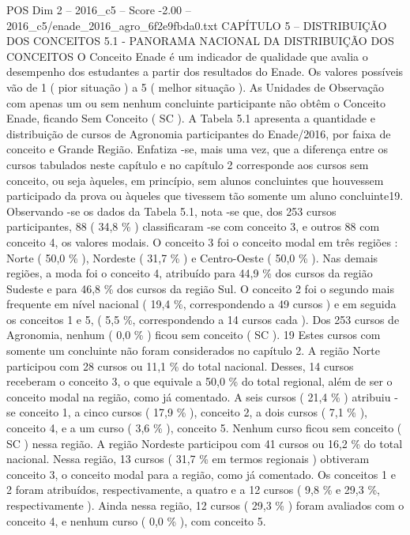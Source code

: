 \begin{textsample}{POS Dim 2 – 2016\_c5 – Score -2.00 – 2016\_c5/enade\_2016\_agro\_6f2e9fbda0.txt}  \label{ex:f2_pos_403}
CAPÍTULO 5 – DISTRIBUIÇÃO DOS CONCEITOS 5.1 - PANORAMA NACIONAL DA DISTRIBUIÇÃO DOS CONCEITOS O Conceito Enade é um indicador de qualidade que avalia o desempenho dos estudantes a partir dos resultados do Enade.
Os valores possíveis vão de 1 ( pior situação ) a 5 ( melhor situação ).
As Unidades de Observação com apenas um ou sem nenhum concluinte participante não obtêm o Conceito Enade, ficando Sem Conceito ( SC ).
A Tabela 5.1 apresenta a quantidade e distribuição de cursos de Agronomia participantes do Enade/2016, por faixa de conceito e Grande Região.
Enfatiza -se, mais uma vez, que a diferença entre os cursos tabulados neste capítulo e no capítulo 2 corresponde aos cursos sem conceito, ou seja àqueles, em princípio, sem alunos concluintes que houvessem participado da prova ou àqueles que tivessem tão somente um aluno concluinte19.
Observando -se os dados da Tabela 5.1, nota -se que, dos 253 cursos participantes, 88 ( 34,8 \% ) classificaram -se com conceito 3, e outros 88 com conceito 4, os valores modais.
O conceito 3 foi o conceito modal em três regiões : Norte ( 50,0 \% ), Nordeste ( 31,7 \% ) e Centro-Oeste ( 50,0 \% ).
Nas demais regiões, a moda foi o conceito 4, atribuído para 44,9 \% dos cursos da região Sudeste e para 46,8 \% dos cursos da região Sul.
O conceito 2 foi o segundo mais frequente em nível nacional ( 19,4 \%, correspondendo a 49 cursos ) e em seguida os conceitos 1 e 5, ( 5,5 \%, correspondendo a 14 cursos cada ).
Dos 253 cursos de Agronomia, nenhum ( 0,0 \% ) ficou sem conceito ( SC ). 19 Estes cursos com somente um concluinte não foram considerados no capítulo 2.
A região Norte participou com 28 cursos ou 11,1 \% do total nacional.
Desses, 14 cursos receberam o conceito 3, o que equivale a 50,0 \% do total regional, além de ser o conceito modal na região, como já comentado.
A seis cursos ( 21,4 \% ) atribuiu -se conceito 1, a cinco cursos ( 17,9 \% ), conceito 2, a dois cursos ( 7,1 \% ), conceito 4, e a um curso ( 3,6 \% ), conceito 5.
Nenhum curso ficou sem conceito ( SC ) nessa região.
A região Nordeste participou com 41 cursos ou 16,2 \% do total nacional.
Nessa região, 13 cursos ( 31,7 \% em termos regionais ) obtiveram conceito 3, o conceito modal para a região, como já comentado.
Os conceitos 1 e 2 foram atribuídos, respectivamente, a quatro e a 12 cursos ( 9,8 \% e 29,3 \%, respectivamente ).
Ainda nessa região, 12 cursos ( 29,3 \% ) foram avaliados com o conceito 4, e nenhum curso ( 0,0 \% ), com conceito 5.

\end{textsample}
